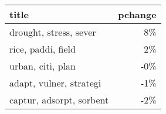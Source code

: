 \begin{tabular}{p{1.2cm}r}
\toprule
                    title &  pchange \\
\midrule
   drought, stress, sever &       8\% \\
       rice, paddi, field &       2\% \\
        urban, citi, plan &      -0\% \\
  adapt, vulner, strategi &      -1\% \\
 captur, adsorpt, sorbent &      -2\% \\
\bottomrule
\end{tabular}
